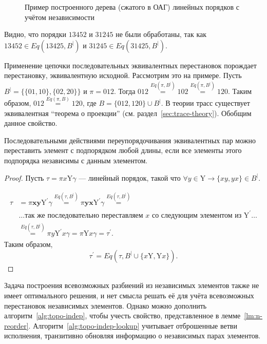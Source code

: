 \begin{figure}[htbp]
  \centerfloat{
    
  }
  \caption{Пример построенного дерева (сжатого в ОАГ) линейных
  порядков с учётом независимости}
  \label{fig:topo-trav-indep-tree}
\end{figure}

Видно, что порядки $13452$ и $31245$ не были обработаны, так как
$13452 \in Eq(13425, B^|)$ и $31245 \in Eq(31425, B^|)$.

Применение цепочки последовательных эквивалентных перестановок
порождает перестановку, эквивалентную исходной. Рассмотрим это на
примере. Пусть $B^{|} = \{\{01, 10\}, \{02, 20\}\}$ и $\pi = 012$.
Тогда $012 \stackrel{Eq(\pi, B^{|})}{=} 102 \stackrel{Eq(\pi,
B^{|})}{=} 120$. Таким образом, $012 \stackrel{Eq(\pi, B)}{=} 120$,
где $B = \{012, 120\} \cup B^{|}$.
В теории трасс существует эквивалентная ``теорема о проекции'' (см.
раздел~\ref{sec:trace-theory}).
Обобщим данное свойство.

\begin{lemma}
  Последовательными действиями переупорядочивания эквивалентных пар
  можно переставить элемент с подпорядком любой длины, если все
  элементы этого подпорядка независимы с данным элементом.
  \label{lm:n-reorder}
\end{lemma}

\begin{proof}
  Пусть $\tau = \pi x \mathrm{Y} \gamma$ — линейный порядок, такой
  что $\forall y \in \mathrm{Y} \rightarrow \{xy, yx\} \in B^|$.

  \begin{align}
    \tau & = \pi \pmb{xy} \mathrm{Y}^{'} \gamma
    \stackrel{Eq(\tau, B^|)}{=}
    \pi \pmb{yx} \mathrm{Y}^{'} \gamma
    \stackrel{Eq(\tau, B^|)}{=} \nonumber \\
    & \dots \text{так же последовательно переставляем } x \text{ со
    следующим элементом из } \mathrm{Y}^{'} \dots \nonumber \\
    & \stackrel{Eq(\tau, B^|)}{=}
    \pi y \mathrm{Y}^{'} x \gamma
    = \pi \mathrm{Y} x \gamma = \tau^{'}. \nonumber
  \end{align}
  Таким образом,
  \[
    \tau^{'} = Eq(\tau, B^| \cup \{x\mathrm{Y}, \mathrm{Y}x\}).
  \]
\end{proof}

Задача построения всевозможных разбиений из независимых элементов
также не имеет оптимального решения, и нет смысла решать её для учёта
всевозможных перестановок независимых элементов. Однако можно
дополнить алгоритм~\ref{alg:topo-indep}, чтобы учесть свойство,
представленное в лемме~\ref{lm:n-reorder}.
Алгоритм~\ref{alg:topo-indep-lookup} учитывает отброшенные ветви
исполнения, транзитивно обновляя информацию о независимых парах элементов.

